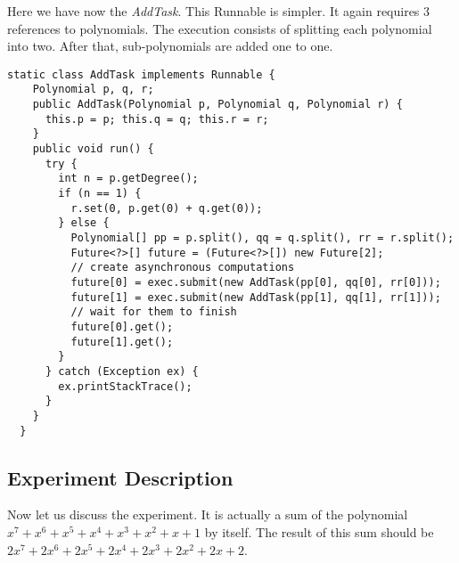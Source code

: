\hfill
\par
Here we have now the \textit{AddTask}. This Runnable is simpler. It again
requires $3$ references to polynomials. The execution consists of splitting each
polynomial into two. After that, sub-polynomials are added one to one. 
\par
\hfill
\begin{lstlisting}[style=numbers]
  static class AddTask implements Runnable {
    Polynomial p, q, r;
    public AddTask(Polynomial p, Polynomial q, Polynomial r) {
      this.p = p; this.q = q; this.r = r;
    }
    public void run() {
      try {
        int n = p.getDegree();
        if (n == 1) {
          r.set(0, p.get(0) + q.get(0));
        } else {
          Polynomial[] pp = p.split(), qq = q.split(), rr = r.split();
          Future<?>[] future = (Future<?>[]) new Future[2];
          // create asynchronous computations
          future[0] = exec.submit(new AddTask(pp[0], qq[0], rr[0]));
          future[1] = exec.submit(new AddTask(pp[1], qq[1], rr[1]));
          // wait for them to finish
          future[0].get();
          future[1].get();
        }
      } catch (Exception ex) {
        ex.printStackTrace();
      }
    }
  }
\end{lstlisting}
\hfill
\par
\subsection{Experiment Description}
\par
Now let us discuss the experiment. It is actually a sum of the
polynomial $x^7+x^6+x^5+x^4+x^3+x^2+x+1$ by itself. The result of this
sum should be $2x^7+2x^6+2x^5+2x^4+2x^3+2x^2+2x+2$. 
\par
